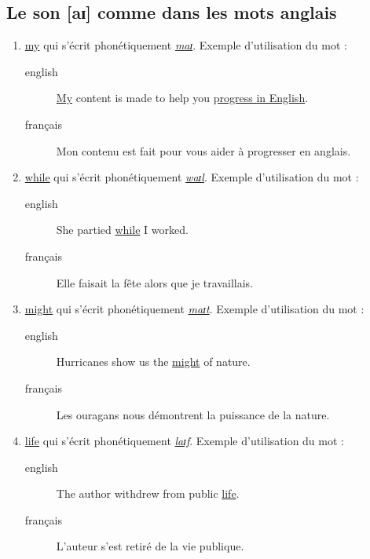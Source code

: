 \documentclass[12pt,a4paper]{book}
\begin{document}
\subsection{Le son [aɪ] comme dans les mots anglais}
\label{sec:ai}
\begin{enumerate}
\item \href{http://www.wordreference.com/enfr/my}{my} qui s'écrit phonétiquement \href{https://dictionary.cambridge.org/dictionary/english/my}{\emph{maɪ}}. Exemple d'utilisation du mot :
\begin{description}
\item[{english}] \textenglish{\href{https://youtu.be/SMwEkjcEACM}{My} content is made to help you \href{https://www.youtube.com/watch?v=m\_uWS6K-VF8\&list=PL0J5xb8JH3VukoRHgk86Yr9BSVeBewCuZ}{progress in English}.}
\item[{français}] Mon contenu est fait pour vous aider à progresser en
anglais.
\end{description}
\item \href{http://www.wordreference.com/enfr/while}{while} qui s'écrit phonétiquement \href{https://dictionary.cambridge.org/dictionary/english/while}{\emph{waɪl}}. Exemple d'utilisation du mot :
\begin{description}
\item[{english}] \textenglish{She partied \href{https://youtu.be/8q182kWAhiM}{while} I worked.}
\item[{français}] Elle faisait la fête alors que je travaillais.
\end{description}
\item \href{http://www.wordreference.com/enfr/might}{might} qui s'écrit phonétiquement \href{https://dictionary.cambridge.org/dictionary/english/might}{\emph{maɪt}}. Exemple d'utilisation du mot :
\begin{description}
\item[{english}] \textenglish{Hurricanes show us the \href{https://youtu.be/Nqlr35WnqTk}{might} of nature.}
\item[{français}] Les ouragans nous démontrent la puissance de la
nature.
\end{description}
\item \href{http://www.wordreference.com/enfr/life}{life} qui s'écrit phonétiquement \href{https://dictionary.cambridge.org/dictionary/english/life}{\emph{laɪf}}. Exemple d'utilisation du mot :
\begin{description}
\item[{english}] \textenglish{The author withdrew from public \href{https://youtu.be/zyKGKoGACVk}{life}.}
\item[{français}] L'auteur s'est retiré de la vie publique.
\end{description}
\end{enumerate}
\end{document}
